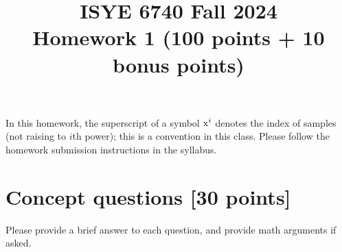 \documentclass[twoside,10pt]{article}
\begin{document}
\title{ISYE 6740 Fall 2024\\ Homework 1 (100 points + 10 bonus points)}
\date{}

\maketitle

\vspace{-.5in}

In this homework, the superscript of a symbol $\text x^i$ denotes the index of samples (not raising to $i$th power); this is a convention in this class. Please follow the homework submission instructions in the syllabus.

\section{Concept questions [30 points]}

Please provide a brief answer to each question, and provide math arguments if asked. 
\end{document}
